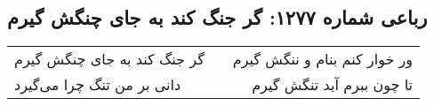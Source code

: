 \begin{center}
\section*{رباعی شماره ۱۲۷۷: گر جنگ کند به جای چنگش گیرم}
\label{sec:1277}
\begin{longtable}{l p{0.5cm} r}
گر جنگ کند به جای چنگش گیرم
&&
ور خوار کنم بنام و ننگش گیرم
\\
دانی بر من تنگ چرا می‌گیرد
&&
تا چون ببرم آید تنگش گیرم
\\
\end{longtable}
\end{center}
